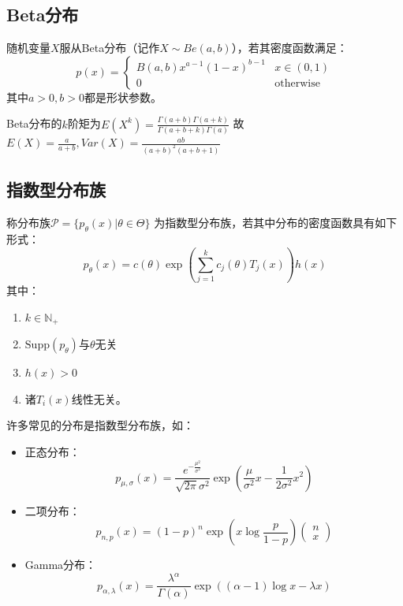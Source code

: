 \documentclass[UTF-8]{ctexbeamer}
\begin{document}
\subsection{Beta分布}
\begin{frame}
  \begin{Def}
  随机变量$X$服从Beta分布（记作$X\sim Be(a,b)$），若其密度函数满足：
  \[p(x)=
    \begin{cases}
      B(a,b)x^{a-1}(1-x)^{b-1}& x\in (0,1)\\ 0&\text{otherwise}
    \end{cases}
  \]
  其中$a>0,b>0$都是形状参数。
\end{Def}
Beta分布的$k$阶矩为$E(X^{k})=\frac{\Gamma(a+b)\Gamma(a+k)}{\Gamma(a+b+k)\Gamma(a)}$
故$E(X)=\frac{a}{a+b},Var(X)=\frac{ab}{(a+b)^{2}(a+b+1)}$ %
\end{frame}

\subsection{指数型分布族}
\begin{frame}
  \begin{Def}
    称分布族$\mathscr{P}=\{p_{\theta}(x)|\theta\in\Theta\}$ 为指数型分布族，若其中分布的密度函数具有如下形式：
    \[p_{\theta}(x)=c(\theta)\exp(\sum_{j=1}^{k}c_{j}(\theta)T_{j}(x))h(x)\]
    其中：
    \begin{enumerate}
    \item $k\in\mathbb{N}_{+}$
    \item $\mathrm{Supp}(p_{\theta})$与$\theta$无关
    \item $h(x)>0$
    \item 诸$T_{i}(x)$线性无关。
    \end{enumerate}
  \end{Def}
\end{frame}

\begin{frame}
  许多常见的分布是指数型分布族，如：
  \begin{itemize}
  \item 正态分布：
    \[p_{\mu,\sigma}(x)=\frac{e^{-\frac{\mu^{2}}{\sigma^{2}}}}{\sqrt{2\pi}\sigma^{2}}\exp(\frac{\mu}{\sigma^{2}}x-\frac{1}{2\sigma^{2}}x^{2})\]
  \item 二项分布：
    \[p_{n,p}(x)=(1-p)^{n}\exp(x\log \frac{p}{1-p})
      \begin{pmatrix}
        n\\x
      \end{pmatrix}
    \]
  \item Gamma分布：
    \[p_{\alpha,\lambda}(x)=\frac{\lambda^{\alpha}}{\Gamma(\alpha)}\exp((\alpha-1)\log x-\lambda x)\]
  \end{itemize}
\end{frame}
\end{document}
